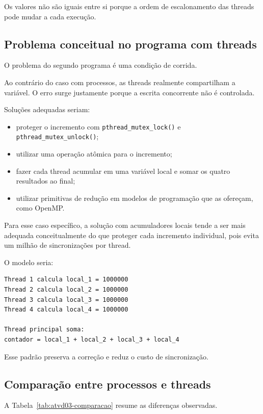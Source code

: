 Os valores não são iguais entre si porque a ordem de escalonamento das threads pode mudar a cada execução.

\subsection{Problema conceitual no programa com threads}

O problema do segundo programa é uma condição de corrida.

Ao contrário do caso com processos, as threads realmente compartilham a variável. O erro surge justamente porque a escrita concorrente não é controlada.

Soluções adequadas seriam:

\begin{itemize}
    \item proteger o incremento com \texttt{pthread\_mutex\_lock()} e \texttt{pthread\_mutex\_unlock()};
    \item utilizar uma operação atômica para o incremento;
    \item fazer cada thread acumular em uma variável local e somar os quatro resultados ao final;
    \item utilizar primitivas de redução em modelos de programação que as ofereçam, como OpenMP.
\end{itemize}

Para esse caso específico, a solução com acumuladores locais tende a ser mais adequada conceitualmente do que proteger cada incremento individual, pois evita um milhão de sincronizações por thread.

O modelo seria:

\begin{verbatim}
Thread 1 calcula local_1 = 1000000
Thread 2 calcula local_2 = 1000000
Thread 3 calcula local_3 = 1000000
Thread 4 calcula local_4 = 1000000

Thread principal soma:
contador = local_1 + local_2 + local_3 + local_4
\end{verbatim}

Esse padrão preserva a correção e reduz o custo de sincronização.

\subsection{Comparação entre processos e threads}

A Tabela~\ref{tab:atvd03-comparacao} resume as diferenças observadas.

